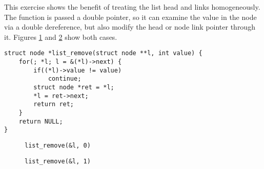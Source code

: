 This exercise shows the benefit of treating the list head and links
homogeneously.  The function is passed a double pointer, so it can examine the
value in the node via a double dereference, but also modify the head or node
link pointer through it.  Figures \ref{fig:sol:list_remove0} and
\ref{fig:sol:list_remove1} show both cases.

\begin{lstlisting}[style=c]
struct node *list_remove(struct node **l, int value) {
    for(; *l; l = &(*l)->next) {
        if((*l)->value != value)
            continue;
        struct node *ret = *l;
        *l = ret->next;
        return ret;
    }
    return NULL;
}
\end{lstlisting}

\begin{figure}[p]
    \centering
    
    \caption{\texttt{list\_remove(\&l, 0)}}
    \label{fig:sol:list_remove0}
\end{figure}

\begin{figure}[p]
    \centering
    
    \caption{\texttt{list\_remove(\&l, 1)}}
    \label{fig:sol:list_remove1}
\end{figure}
